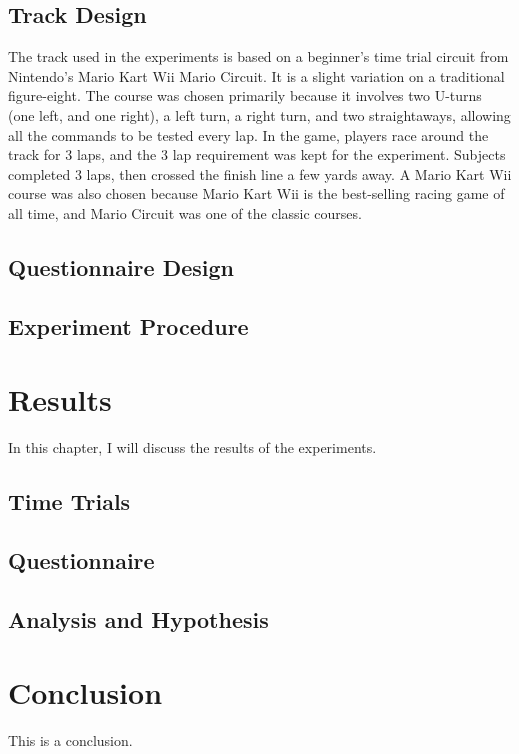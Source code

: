 \documentclass[12pt,a4paper]{report}
\begin{document}
\section{Track Design}
The track used in the experiments is based on a beginner's time trial circuit from Nintendo's Mario Kart Wii Mario Circuit. 
It is a slight variation on a traditional figure-eight. The course was chosen primarily because it involves two U-turns (one left, and one right), a left turn, a right turn, and two straightaways, allowing all the commands to be tested every lap. In the game, players race around the track for 3 laps, and the 3 lap requirement was kept for the experiment. Subjects completed 3 laps, then crossed the finish line a few yards away. A Mario Kart Wii course was also chosen because Mario Kart Wii is the  best-selling racing game of all time, and Mario Circuit was one of the classic courses. 
\section{Questionnaire Design}
\section{Experiment Procedure}

\chapter{Results}
In this chapter, I will discuss the results of the experiments. 
\section{Time Trials}
\section{Questionnaire}
\section{Analysis and Hypothesis}

\chapter{Conclusion}
This is a conclusion.



\end{document}
